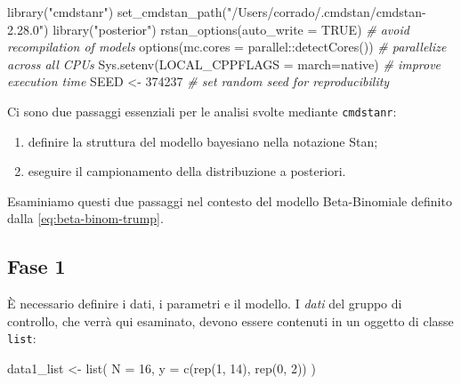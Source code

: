 \documentclass[
  10pt,
  italian,
  a4paper,
  extrafontsizes,onecolumn,openright
  ]{memoir}
\newenvironment{Shaded}{\begin{snugshade}}{\end{snugshade}}
\newcommand{\AttributeTok}[1]{\textcolor[rgb]{0.77,0.63,0.00}{#1}}
\newcommand{\CommentTok}[1]{\textcolor[rgb]{0.56,0.35,0.01}{\textit{#1}}}
\newcommand{\ConstantTok}[1]{\textcolor[rgb]{0.00,0.00,0.00}{#1}}
\newcommand{\DecValTok}[1]{\textcolor[rgb]{0.00,0.00,0.81}{#1}}
\newcommand{\FunctionTok}[1]{\textcolor[rgb]{0.00,0.00,0.00}{#1}}
\newcommand{\NormalTok}[1]{#1}
\newcommand{\OtherTok}[1]{\textcolor[rgb]{0.56,0.35,0.01}{#1}}
\newcommand{\SpecialCharTok}[1]{\textcolor[rgb]{0.00,0.00,0.00}{#1}}
\newcommand{\StringTok}[1]{\textcolor[rgb]{0.31,0.60,0.02}{#1}}
\begin{document}
\begin{Shaded}
\begin{Highlighting}[]
\FunctionTok{library}\NormalTok{(}\StringTok{"cmdstanr"}\NormalTok{)}
\FunctionTok{set\_cmdstan\_path}\NormalTok{(}\StringTok{"/Users/corrado/.cmdstan/cmdstan{-}2.28.0"}\NormalTok{)}
\FunctionTok{library}\NormalTok{(}\StringTok{"posterior"}\NormalTok{)}
\FunctionTok{rstan\_options}\NormalTok{(}\AttributeTok{auto\_write =} \ConstantTok{TRUE}\NormalTok{) }\CommentTok{\# avoid recompilation of models}
\FunctionTok{options}\NormalTok{(}\AttributeTok{mc.cores =}\NormalTok{ parallel}\SpecialCharTok{::}\FunctionTok{detectCores}\NormalTok{()) }\CommentTok{\# parallelize across all CPUs}
\FunctionTok{Sys.setenv}\NormalTok{(}\AttributeTok{LOCAL\_CPPFLAGS =} \StringTok{\textquotesingle{}{-}march=native\textquotesingle{}}\NormalTok{) }\CommentTok{\# improve execution time}
\NormalTok{SEED }\OtherTok{\textless{}{-}} \DecValTok{374237} \CommentTok{\# set random seed for reproducibility}
\end{Highlighting}
\end{Shaded}

Ci sono due passaggi essenziali per le analisi svolte mediante \texttt{cmdstanr}:

\begin{enumerate}
\def\labelenumi{\arabic{enumi}.}
\item
  definire la struttura del modello bayesiano nella notazione Stan;
\item
  eseguire il campionamento della distribuzione a posteriori.
\end{enumerate}

Esaminiamo questi due passaggi nel contesto del modello Beta-Binomiale definito dalla \eqref{eq:beta-binom-trump}.

\hypertarget{fase-1}{%
\subsection{Fase 1}\label{fase-1}}

È necessario definire i dati, i parametri e il modello. I \emph{dati} del gruppo di controllo, che verrà qui esaminato, devono essere contenuti in un oggetto di classe \texttt{list}:

\begin{Shaded}
\begin{Highlighting}[]
\NormalTok{data1\_list }\OtherTok{\textless{}{-}} \FunctionTok{list}\NormalTok{(}
  \AttributeTok{N =} \DecValTok{16}\NormalTok{,}
  \AttributeTok{y =} \FunctionTok{c}\NormalTok{(}\FunctionTok{rep}\NormalTok{(}\DecValTok{1}\NormalTok{, }\DecValTok{14}\NormalTok{), }\FunctionTok{rep}\NormalTok{(}\DecValTok{0}\NormalTok{, }\DecValTok{2}\NormalTok{))}
\NormalTok{)}
\end{Highlighting}
\end{Shaded}
\end{document}
